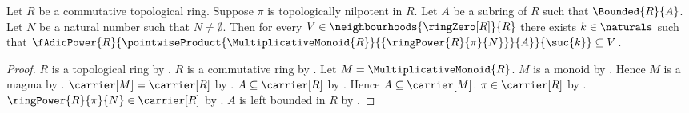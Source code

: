 \begin{theorem}\label{topologically_nilpotent_scalar_multiple_powers_refine}
    Let $R$ be a commutative topological ring.
    Suppose $\pi$ is topologically nilpotent in $R$.
    Let $A$ be a subring of $R$ such that $\Bounded{R}{A}$.
    Let $N$ be a natural number such that $N\neq\emptyset$.
    Then for every $V\in\neighbourhoods{\ringZero[R]}{R}$ there exists
        $k\in\naturals$ such that
        $\fAdicPower{R}{
            \pointwiseProduct{\MultiplicativeMonoid{R}}{
                \{\ringPower{R}{\pi}{N}\}}{A}}{\suc{k}}\subseteq V$.
\end{theorem}
\begin{proof}
    $R$ is a topological ring by
        .
    $R$ is a commutative ring by
        .
    Let $M=\MultiplicativeMonoid{R}$.
    $M$ is a monoid by .
    Hence $M$ is a magma by .
    $\carrier[M]=\carrier[R]$ by
        .
    $A\subseteq\carrier[R]$ by .
    Hence $A\subseteq\carrier[M]$.
    $\pi\in\carrier[R]$ by
        .
    $\ringPower{R}{\pi}{N}\in\carrier[R]$ by
        .
    $A$ is left bounded in $R$ by
        .


\end{proof}
